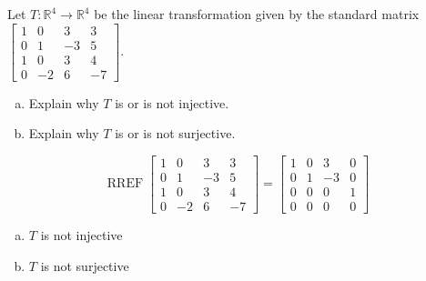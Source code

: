 
\begin{exerciseStatement}
 Let \(T:\mathbb{R}^ 4  \to \mathbb{R}^ 4 \) be the linear transformation given by the standard matrix \( \left[\begin{array}{cccc}
1 & 0 & 3 & 3 \\
0 & 1 & -3 & 5 \\
1 & 0 & 3 & 4 \\
0 & -2 & 6 & -7
\end{array}\right] .\)
\begin{enumerate}[(a)]
\item Explain why \(T\) is or is not injective.
\item Explain why \(T\) is or is not surjective.
\end{enumerate}
    
\end{exerciseStatement}
    
\begin{exerciseAnswer} 


\[\operatorname{RREF} \left[\begin{array}{cccc}
1 & 0 & 3 & 3 \\
0 & 1 & -3 & 5 \\
1 & 0 & 3 & 4 \\
0 & -2 & 6 & -7
\end{array}\right] = \left[\begin{array}{cccc}
1 & 0 & 3 & 0 \\
0 & 1 & -3 & 0 \\
0 & 0 & 0 & 1 \\
0 & 0 & 0 & 0
\end{array}\right] \]


\begin{enumerate}[(a)]
\item \(T\) is not injective
\item \(T\) is not surjective
\end{enumerate}
    
\end{exerciseAnswer}
    
